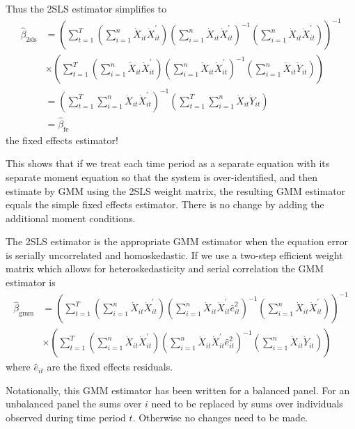 \documentclass[10pt]{article}
\begin{document}
Thus the 2SLS estimator simplifies to
$$
\begin{aligned}
\widehat{\beta}_{2 \mathrm{sls}} &=\left(\sum_{t=1}^{T}\left(\sum_{i=1}^{n} \dot{X}_{i t} \dot{X}_{i t}^{\prime}\right)\left(\sum_{i=1}^{n} \dot{X}_{i t} \dot{X}_{i t}^{\prime}\right)^{-1}\left(\sum_{i=1}^{n} \dot{X}_{i t} \dot{X}_{i t}^{\prime}\right)\right)^{-1} \\
& \times\left(\sum_{t=1}^{T}\left(\sum_{i=1}^{n} \dot{X}_{i t} \dot{X}_{i t}^{\prime}\right)\left(\sum_{i=1}^{n} \dot{X}_{i t} \dot{X}_{i t}^{\prime}\right)^{-1}\left(\sum_{i=1}^{n} \dot{X}_{i t} \dot{Y}_{i t}\right)\right) \\
&=\left(\sum_{t=1}^{T} \sum_{i=1}^{n} \dot{X}_{i t} \dot{X}_{i t}^{\prime}\right)^{-1}\left(\sum_{t=1}^{T} \sum_{i=1}^{n} \dot{X}_{i t} \dot{Y}_{i t}\right) \\
&=\widehat{\beta}_{\mathrm{fe}}
\end{aligned}
$$
the fixed effects estimator!

This shows that if we treat each time period as a separate equation with its separate moment equation so that the system is over-identified, and then estimate by GMM using the 2SLS weight matrix, the resulting GMM estimator equals the simple fixed effects estimator. There is no change by adding the additional moment conditions.

The 2SLS estimator is the appropriate GMM estimator when the equation error is serially uncorrelated and homoskedastic. If we use a two-step efficient weight matrix which allows for heteroskedasticity and serial correlation the GMM estimator is
$$
\begin{aligned}
\widehat{\beta}_{\mathrm{gmm}} &=\left(\sum_{t=1}^{T}\left(\sum_{i=1}^{n} \dot{X}_{i t} \dot{X}_{i t}^{\prime}\right)\left(\sum_{i=1}^{n} \dot{X}_{i t} \dot{X}_{i t}^{\prime} \widehat{e}_{i t}^{2}\right)^{-1}\left(\sum_{i=1}^{n} \dot{X}_{i t} \dot{X}_{i t}^{\prime}\right)\right)^{-1} \\
& \times\left(\sum_{t=1}^{T}\left(\sum_{i=1}^{n} \dot{X}_{i t} \dot{X}_{i t}^{\prime}\right)\left(\sum_{i=1}^{n} \dot{X}_{i t} \dot{X}_{i t}^{\prime} \widehat{e}_{i t}^{2}\right)^{-1}\left(\sum_{i=1}^{n} \dot{X}_{i t} \dot{Y}_{i t}\right)\right)
\end{aligned}
$$
where $\widehat{e}_{i t}$ are the fixed effects residuals.

Notationally, this GMM estimator has been written for a balanced panel. For an unbalanced panel the sums over $i$ need to be replaced by sums over individuals observed during time period $t$. Otherwise no changes need to be made.
\end{document}
